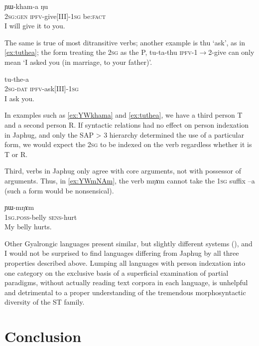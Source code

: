 \documentclass[oldfontcommands,oneside,a4paper,11pt]{article}
\newcommand{\ipa}[1]{{\phon \mbox{#1}}} %
\begin{document}
\begin{exe}
\ex \label{ex:YWkhama}
\gll \ipa{nɤʑɯɣ} 	\ipa{ɲɯ-kham-a} \ipa{ŋu} \\
\textsc{2sg:gen} \textsc{ipfv}-give[III]-\textsc{1sg} be:\textsc{fact} \\
\glt I will give it to you.
\end{exe}

The same is true of most ditransitive verbs; another example is \ipa{thu} `ask', as in \ref{ex:tuthea}; the form treating the \textsc{2sg} as the P, \ipa{tu-ta-thu} \textsc{ipfv}-1$\rightarrow$2-give can only mean `I asked you (in marriage, to your father)'.

\begin{exe}
\ex \label{ex:tuthea}
\gll \ipa{nɤ-ɕki} 	\ipa{tu-the-a} \\
\textsc{2sg-dat} \textsc{ipfv}-ask[III]-\textsc{1sg} \\
\glt I ask you.
\end{exe}

In examples such as \ref{ex:YWkhama} and \ref{ex:tuthea}, we have a third person T and a second person R. If syntactic relations had no effect on person indexation in Japhug, and only the SAP > 3 hierarchy determined the use of a particular form, we would expect the \textsc{2sg} to be indexed on the verb regardless whether it is T or R.

Third, verbs in Japhug only agree with core arguments, not with possessor of arguments. Thus, in \ref{ex:YWmNAm}, the verb \ipa{mŋɤm} cannot take the \textsc{1sg} suffix \ipa{--a} (such a form would be nonsensical).

\begin{exe}
\ex \label{ex:YWmNAm}
\gll \ipa{a-xtu} 	\ipa{ɲɯ-mŋɤm} \\
\textsc{1sg.poss}-belly \textsc{sens}-hurt \\
\glt My belly hurts.
\end{exe}

Other Gyalrongic languages present similar, but slightly different systems (\citealt{lai14person}), and I would not be surprised to find languages differing from Japhug by all three properties described above. Lumping all languages with person indexation into one category on the exclusive basis of a superficial examination of partial paradigms, without actually reading text corpora in each  language, is unhelpful and detrimental to a proper understanding of the tremendous morphosyntactic diversity of the ST family.

\section{Conclusion}
\end{document}
